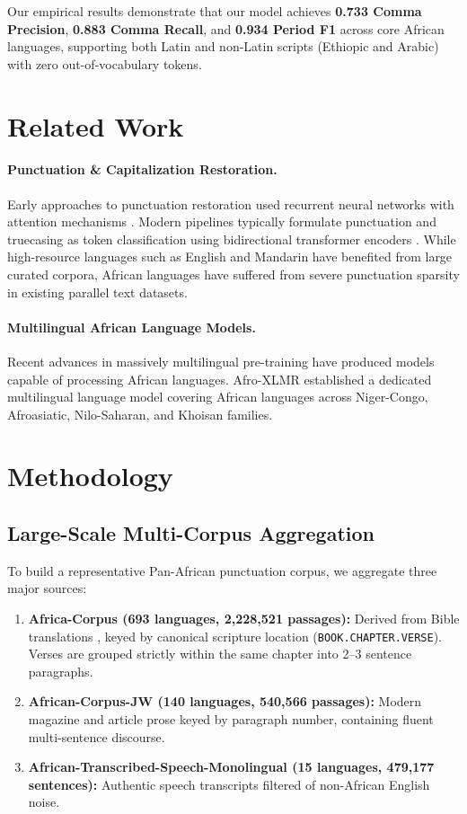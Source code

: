 \documentclass[11pt,a4paper]{article}
\begin{document}
Our empirical results demonstrate that our model achieves \textbf{0.733 Comma Precision}, \textbf{0.883 Comma Recall}, and \textbf{0.934 Period F1} across core African languages, supporting both Latin and non-Latin scripts (Ethiopic and Arabic) with zero out-of-vocabulary tokens.

\section{Related Work}

\paragraph{Punctuation \& Capitalization Restoration.}
Early approaches to punctuation restoration used recurrent neural networks with attention mechanisms \cite{tilk2016bidirectional}. Modern pipelines typically formulate punctuation and truecasing as token classification using bidirectional transformer encoders \cite{courtland2020efficient}. While high-resource languages such as English and Mandarin have benefited from large curated corpora, African languages have suffered from severe punctuation sparsity in existing parallel text datasets.

\paragraph{Multilingual African Language Models.}
Recent advances in massively multilingual pre-training have produced models capable of processing African languages. Afro-XLMR \cite{adelani2022afro} established a dedicated multilingual language model covering African languages across Niger-Congo, Afroasiatic, Nilo-Saharan, and Khoisan families.

\section{Methodology}

\subsection{Large-Scale Multi-Corpus Aggregation}
To build a representative Pan-African punctuation corpus, we aggregate three major sources:
\begin{enumerate}
    \item \textbf{Africa-Corpus (693 languages, 2,228,521 passages):} Derived from Bible translations \cite{black2019cmu}, keyed by canonical scripture location (\texttt{BOOK.CHAPTER.VERSE}). Verses are grouped strictly within the same chapter into 2--3 sentence paragraphs.
    \item \textbf{African-Corpus-JW (140 languages, 540,566 passages):} Modern magazine and article prose keyed by paragraph number, containing fluent multi-sentence discourse.
    \item \textbf{African-Transcribed-Speech-Monolingual (15 languages, 479,177 sentences):} Authentic speech transcripts filtered of non-African English noise.
\end{enumerate}
\end{document}

